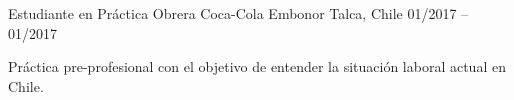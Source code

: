 \begin{cventries}
  \cventry
    {Estudiante en Práctica Obrera} %
    {Coca-Cola Embonor } %
    {Talca, Chile} %
    {01/2017 – 01/2017 } %
    {
      \begin{cvitems} %
        \item {Práctica pre-profesional con el objetivo de entender la situación laboral actual en Chile.}
      \end{cvitems}
    }

\end{cventries}
